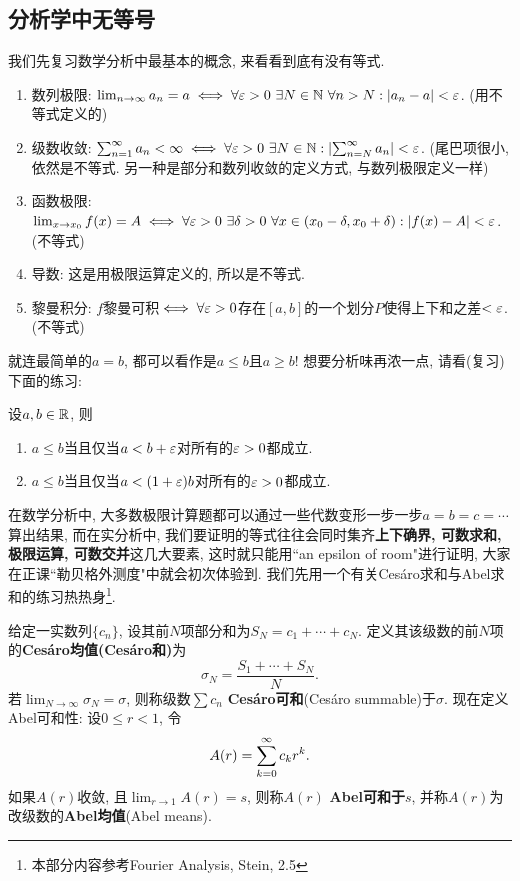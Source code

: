\subsection{分析学中无等号}
我们先复习数学分析中最基本的概念, 来看看到底有没有等式.
\begin{enumerate}
    \item 数列极限: $\lim_{n \to \infty}a_n = a \iff \forall \varepsilon>0~\exists N \in \mathbb{N}~\forall n > N: |a_n-a| < \varepsilon$. (用不等式定义的)
    \item 级数收敛: $\sum_{n=1}^{\infty} a_n < \infty \iff \forall \varepsilon>0~\exists N \in \mathbb{N}: \abs{\sum_{n=N}^{\infty}a_n} < \varepsilon$. (尾巴项很小, 依然是不等式. 另一种是部分和数列收敛的定义方式, 与数列极限定义一样)
    \item 函数极限: $\lim_{x \to x_0} f(x) = A \iff \forall \varepsilon>0~\exists \delta>0~\forall x \in (x_0 - \delta, x_0 + \delta): |f(x) - A|<\varepsilon$. (不等式)
    \item 导数: 这是用极限运算定义的, 所以是不等式.
    \item 黎曼积分: $f$黎曼可积$\iff \forall \varepsilon > 0$存在$[a,b]$的一个划分$P$使得上下和之差$<\varepsilon$. (不等式)  
\end{enumerate}
就连最简单的$a=b$, 都可以看作是$a\leq b$且$a \geq b$! 想要分析味再浓一点, 请看(复习)下面的练习:
\begin{exercise}
    设$a,b \in \mathbb{R}$, 则
    \begin{enumerate}
    \item $a \leq b$当且仅当$a<b+\varepsilon$对所有的$\varepsilon>0$都成立. 
    \item $a \leq b$当且仅当$a<(1+\varepsilon)b$对所有的$\varepsilon>0$都成立. 
    \end{enumerate}
\end{exercise}
在数学分析中, 大多数极限计算题都可以通过一些代数变形一步一步$a=b=c=\cdots$算出结果, 
而在实分析中, 我们要证明的等式往往会同时集齐\textbf{上下确界, 可数求和, 极限运算, 可数交并}这几大要素, 这时就只能用``an epsilon of room"进行证明, 大家在正课``勒贝格外测度"中就会初次体验到. 我们先用一个有关Ces\'aro求和与Abel求和的练习热热身\footnote{本部分内容参考Fourier Analysis, Stein, 2.5}.

给定一实数列$\{c_n\}$, 设其前$N$项部分和为$S_N = c_1 + \cdots + c_N$. 
定义其该级数的前$N$项的\textbf{Ces\'aro均值(Ces\'aro和)}为
$$ \sigma_N = \frac{S_1 + \cdots + S_N}{N}. $$
若$\lim_{N \to \infty}\sigma_N = \sigma$, 则称级数$\sum c_n$ \textbf{Ces\'aro可和}(Ces\'aro summable)于$\sigma$. 现在定义Abel可和性: 设$0 \leq r < 1$, 令
$$ A(r) = \sum_{k=0}^{\infty} c_k r^k. $$
如果$A(r)$收敛, 且$\lim_{r \to 1} A(r) = s$, 则称$A(r)$ \textbf{Abel可和于}$s$, 并称$A(r)$为改级数的\textbf{Abel均值}(Abel means). 

